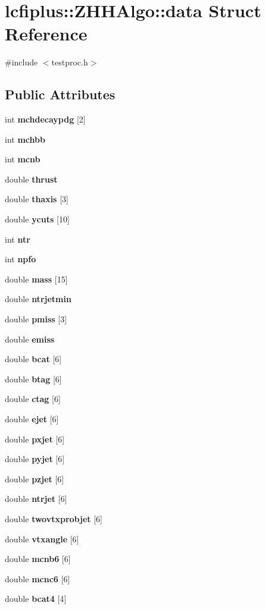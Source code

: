\section{lcfiplus\+:\+:Z\+H\+H\+Algo\+:\+:data Struct Reference}
\label{structlcfiplus_1_1ZHHAlgo_1_1data}


{\ttfamily \#include $<$testproc.\+h$>$}

\subsection*{Public Attributes}
\begin{DoxyCompactItemize}
\item 
int \textbf{ mchdecaypdg} [2]
\item 
int \textbf{ mchbb}
\item 
int \textbf{ mcnb}
\item 
double \textbf{ thrust}
\item 
double \textbf{ thaxis} [3]
\item 
double \textbf{ ycuts} [10]
\item 
int \textbf{ ntr}
\item 
int \textbf{ npfo}
\item 
double \textbf{ mass} [15]
\item 
double \textbf{ ntrjetmin}
\item 
double \textbf{ pmiss} [3]
\item 
double \textbf{ emiss}
\item 
double \textbf{ bcat} [6]
\item 
double \textbf{ btag} [6]
\item 
double \textbf{ ctag} [6]
\item 
double \textbf{ ejet} [6]
\item 
double \textbf{ pxjet} [6]
\item 
double \textbf{ pyjet} [6]
\item 
double \textbf{ pzjet} [6]
\item 
double \textbf{ ntrjet} [6]
\item 
double \textbf{ twovtxprobjet} [6]
\item 
double \textbf{ vtxangle} [6]
\item 
double \textbf{ mcnb6} [6]
\item 
double \textbf{ mcnc6} [6]
\item 
double \textbf{ bcat4} [4]
\item 

\end{DoxyCompactItemize}

